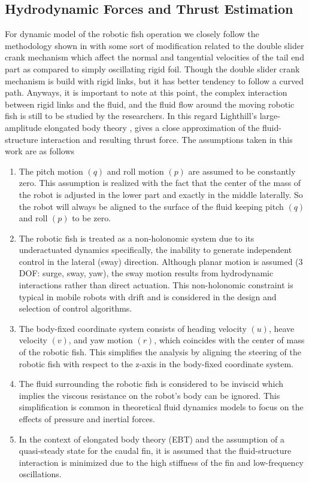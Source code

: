 \documentclass[pdflatex,sn-mathphys-num]{sn-jnl}
\theoremstyle{thmstyleone}%
\begin{document}
\subsection{Hydrodynamic Forces and Thrust Estimation}
\par For dynamic model of the robotic fish operation we closely follow the methodology shown in \cite{Wang2013} with some sort of modification related to the double slider crank mechanism which affect the normal and tangential velocities of the tail end part as compared to simply oscillating rigid foil. Though the double slider crank mechanism is build with rigid links, but it has better tendency to follow a curved path. Anyways, it is important to note at this point, the complex interaction between rigid links and the fluid, and the fluid flow around the moving robotic fish is still to be studied by the researchers. In this regard Lighthill's large-amplitude elongated body theory \cite{Lighthill1971}, gives a close approximation of the fluid-structure interaction and resulting thrust force. The assumptions taken in this work are as follows
\begin{enumerate}
    \item The pitch motion $(q)$ and roll motion $(p)$ are assumed to be constantly zero. This assumption is realized with the fact that the center of the mass of the robot is adjusted in the lower part and exactly in the middle laterally. So the robot will always be aligned to the surface of the fluid keeping pitch $(q)$ and roll $(p)$ to be zero.
    \item The robotic fish is treated as a non-holonomic system due to its underactuated dynamics specifically, the inability to generate independent control in the lateral (sway) direction. Although planar motion is assumed (3 DOF: surge, sway, yaw), the sway motion results from hydrodynamic interactions rather than direct actuation. This non-holonomic constraint is typical in mobile robots with drift and is considered in the design and selection of control algorithms.
    \item The body-fixed coordinate system consists of heading velocity $(u)$, heave velocity $(v)$, and yaw motion $(r)$, which coincides with the center of mass of the robotic fish. This simplifies the analysis by aligning the steering of the robotic fish with respect to the z-axis in the body-fixed coordinate system.
    \item The fluid surrounding the robotic fish is considered to be inviscid which implies the viscous resistance on the robot's body can be ignored. This simplification is common in theoretical fluid dynamics models to focus on the effects of pressure and inertial forces.
    \item In the context of elongated body theory (EBT) and the assumption of a quasi-steady state for the caudal fin, it is assumed that the fluid-structure interaction is minimized due to the high stiffness of the fin and low-frequency oscillations. 
\end{enumerate}
\end{document}
